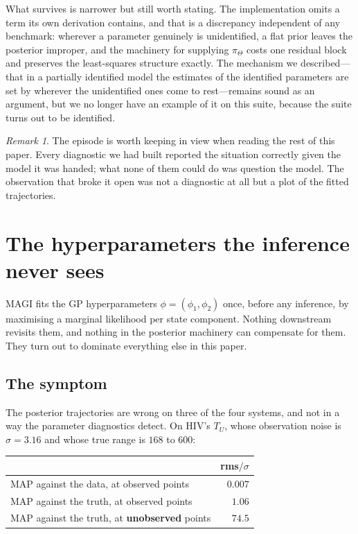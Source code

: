 \documentclass[11pt]{article}
\theoremstyle{plain}
\theoremstyle{definition}
\theoremstyle{remark}
\newtheorem{remark}{Remark}
\begin{document}
What survives is narrower but still worth stating. The implementation omits a term its own
derivation contains, and that is a discrepancy independent of any benchmark: wherever a parameter
genuinely is unidentified, a flat prior leaves the posterior improper, and the machinery for
supplying $\pi_\Theta$ costs one residual block and preserves the least-squares structure exactly.
The mechanism we described---that in a partially identified model the estimates of the identified
parameters are set by wherever the unidentified ones come to rest---remains sound as an argument,
but we no longer have an example of it on this suite, because the suite turns out to be identified.

\begin{remark}
The episode is worth keeping in view when reading the rest of this paper. Every diagnostic we had
built reported the situation correctly given the model it was handed; what none of them could do
was question the model. The observation that broke it open was not a diagnostic at all but a plot
of the fitted trajectories.
\end{remark}

\section{The hyperparameters the inference never sees}
\label{sec:gp}

MAGI fits the GP hyperparameters $\phi = (\phi_1, \phi_2)$ once, before any inference, by
maximising a marginal likelihood per state component. Nothing downstream revisits them, and
nothing in the posterior machinery can compensate for them. They turn out to dominate everything
else in this paper.

\subsection{The symptom}

The posterior trajectories are wrong on three of the four systems, and not in a way the parameter
diagnostics detect. On HIV's $T_U$, whose observation noise is $\sigma = 3.16$ and whose true range
is $168$ to $600$:

\begin{center}\small
\begin{tabular}{lr}
\toprule
 & rms$/\sigma$\\
\midrule
MAP against the data, at observed points & $0.007$\\
MAP against the truth, at observed points & $1.06$\\
MAP against the truth, at \textbf{unobserved} points & $\mathbf{74.5}$\\
\bottomrule
\end{tabular}
\end{center}
\end{document}
